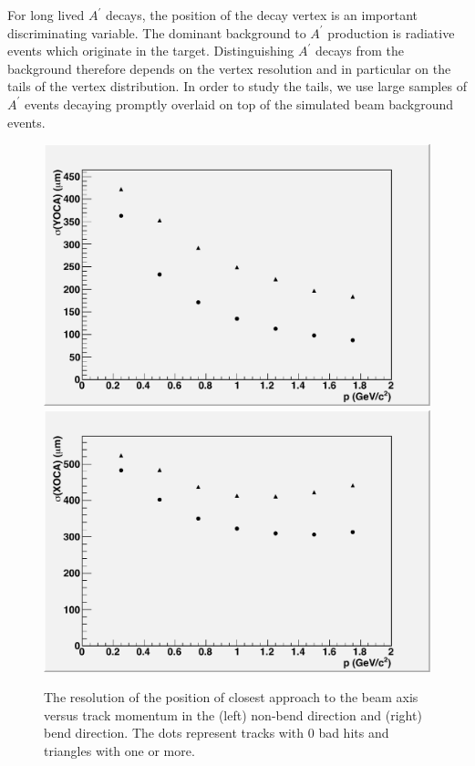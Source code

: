 For long lived  $A^\prime$ decays, the position of the decay vertex is an important discriminating 
variable.  The dominant background to $A^\prime$ production is radiative events which originate 
in the target. Distinguishing $A^\prime$ decays from the background therefore depends on the vertex 
resolution and in particular on the tails of the vertex distribution. In order to study 
the tails, we use large samples of $A^\prime$ events decaying promptly overlaid on top of the 
simulated beam background events.
   
\begin{figure}
\includegraphics[scale=0.4]{performance/tracking_performance/yoca2pt2GeV-MomResolution.pdf}
\includegraphics[scale=0.4]{performance/tracking_performance/xoca2pt2GeV-MomResolution.pdf}
\caption{The resolution of the position of closest approach to the beam axis 
versus track momentum in the (left) non-bend direction and (right) bend direction.  
The dots represent tracks with 0 bad hits and triangles with one or more. }
 \label{fig:doca}
\end{figure}

